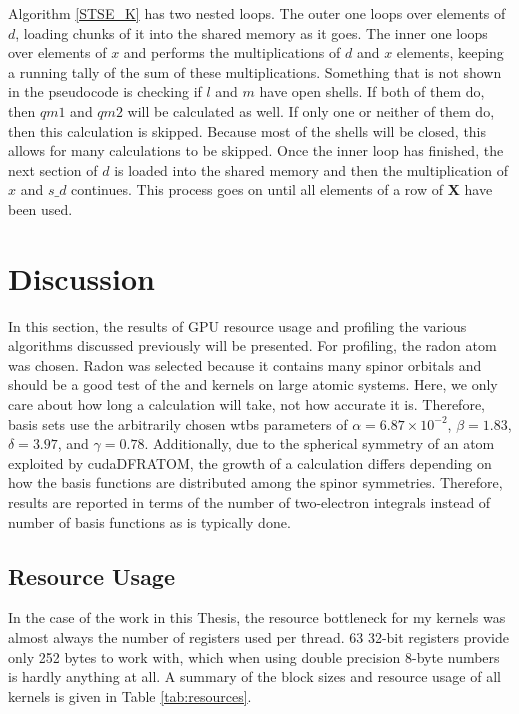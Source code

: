 Algorithm \ref{STSE_K} has two nested loops. The outer one loops over elements of $d$, loading chunks of it into the shared memory as it goes. The inner one loops over elements of $x$ and performs the multiplications of $d$ and $x$ elements, keeping a running tally of the sum of these multiplications. Something that is not shown in the pseudocode is checking if $l$ and $m$ have open shells. If both of them do, then $qm1$ and $qm2$ will be calculated as well. If only one or neither of them do, then this calculation is skipped. Because most of the shells will be closed, this allows for many calculations to be skipped. Once the inner loop has finished, the next section of $d$ is loaded into the shared memory and then the multiplication of $x$ and $s\_d$ continues. This process goes on until all elements of a row of \textbf{X} have been used.

\section{Discussion}
In this section, the results of GPU resource usage and profiling the various algorithms discussed previously will be presented. For profiling, the radon atom was chosen. Radon was selected because it contains many spinor orbitals and should be a good test of the  and  kernels on large atomic systems. Here, we only care about how long a calculation will take, not how accurate it is. Therefore, basis sets use the arbitrarily chosen wtbs parameters of $\alpha = 6.87\times10^{-2}$, $\beta = 1.83$,  $\delta = 3.97$, and $\gamma = 0.78$. Additionally, due to the spherical symmetry of an atom exploited by cudaDFRATOM, the growth of a calculation differs depending on how the basis functions are distributed among the spinor symmetries. Therefore, results are reported in terms of the number of two-electron integrals instead of number of basis functions as is typically done.
\subsection{Resource Usage}
In the case of the work in this Thesis, the resource bottleneck for my kernels was almost always the number of registers used per thread. 63 32-bit registers provide only 252 bytes to work with, which when using double precision 8-byte numbers is hardly anything at all. A summary of the block sizes and resource usage of all kernels is given in Table \ref{tab:resources}.

